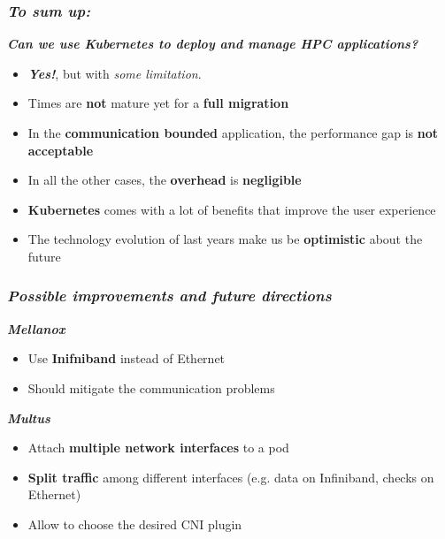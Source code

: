 \begin{frame}
  \frametitle{ \textit{To sum up:}}
  \large{
     \textit\textbf{{Can we use Kubernetes to deploy and manage HPC applications?}}
  }
  \pause
  \begin{itemize}
    \item {} \alert{\textit{\textbf{Yes!}}}, but with \textit{some limitation}.
    \pause
    \item {} Times are \textbf{not}
      mature yet for a \alert{\textbf{full migration}}
    \item {} In the \textbf{communication bounded} application, the performance gap
      is \textbf{not acceptable}
    \item {} In all the other cases, the \alert{\textbf{overhead}} is \alert{\textbf{negligible}}
    \pause
    \item {} \textbf{Kubernetes} comes with a lot of benefits
      that improve the user experience
    \item {} The technology evolution of last years make us
      be \alert{\textbf{optimistic}} about the future
  \end{itemize}

\end{frame}

\begin{frame}
  \frametitle{ \textit{Possible improvements and future directions}}
  \textbf{\textit{Mellanox}}
  \begin{itemize}
    \itemsep0em
    \item Use \alert{\textbf{Inifniband}} instead of Ethernet
    \item Should mitigate the communication problems
  \end{itemize}
  \pause
  \vspace{.5em}
  \textbf{\textit{Multus}}
  \begin{itemize}
    \itemsep0em
    \item Attach \textbf{multiple network interfaces} to a pod
    \item \alert{\textbf{Split traffic}} among different interfaces (e.g.
      \alert{data} on Infiniband, \alert{checks} on Ethernet)
    \item Allow to choose the desired CNI plugin
  \end{itemize}
\end{frame}
